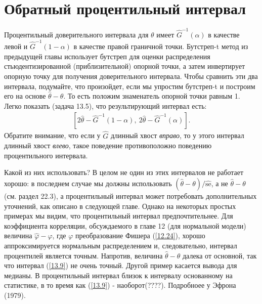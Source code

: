 \section{Обратный процентильный интервал}
Процентильный доверительного интервала для $\theta$ имеет $\widehat{G}^{-1}(\alpha)$ в качестве левой и $\widehat{G}^{-1}(1 - \alpha)$ в качестве правой граничной точки. Бутстреп-t метод из предыдущей главы использует бутстреп для оценки распределения стьюдентизированной (приблизительной) опорной точки, а затем инвертирует опорную точку для получения доверительного интервала. Чтобы сравнить эти два интервала, подумайте, что произойдет, если мы упростим  бутстреп-t и построим его на основе $\widehat{\theta} - \theta$. То есть положим знаменатель опорной точки равным 1. Легко показать (задача 13.5), что результирующий интервал есть:
\begin{gather}\label{13.9}
[2\widehat{\theta} - \widehat{G}^{-1}(1 - \alpha),\ 2\widehat{\theta} - \widehat{G}^{-1}(\alpha)].
\end{gather}
Обратите внимание, что если у $\widehat{G}$ длинный хвост \textit{вправо}, то у этого интервал длинный хвост \textit{влево}, такое поведение противоположно поведению процентильного интервала. 

Какой из них использовать? В целом не один из этих интервалов не работает хорошо: в последнем случае мы должны использовать $(\widehat{\theta} - \theta) /  \widehat{\text{se}}$, а не $\widehat{\theta} - \theta$ (см. раздел 22.3), а процентильный интервал может потребовать дополнительных уточнений, как описано в следующей главе. Однако на некоторых простых примерах мы видим, что процентильный интервал предпочтительнее. Для коэффициента корреляции, обсуждаемого в главе 12 (для нормальной модели) величина $\widehat{\varphi} - \varphi$, где $\varphi$ преобразование Фишера (\ref{12.24}), хорошо аппроксимируется нормальным распределением и, следовательно, интервал процентилей является точным. Напротив, величина $\widehat{\theta} - \theta$ далека от основной, так что интервал (\ref{13.9}) не очень точный. Другой пример касается вывода для медианы. В процентильный интервал близок к интервалу основанному на статистике, в то время как (\ref{13.9}) - наоборот(????). Подробноее у Эфрона (1979).